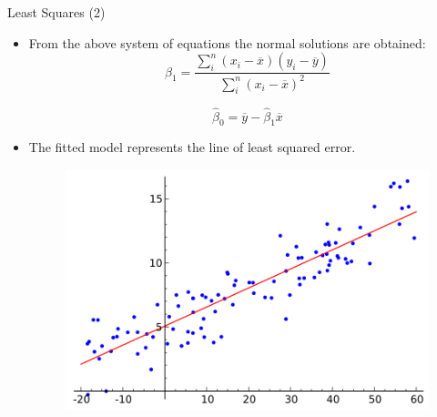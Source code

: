 \documentclass[handout]{beamer}
\begin{document}
\begin{frame}{Least Squares (2)}
\scriptsize{
\begin{itemize}
 \item From the above system of equations the normal solutions are obtained:
  \begin{equation}
 \hat{\beta}_{1} = \frac{\sum_{i}^{n} (x_i-\overline{x})(y_i-\overline{y}) }{ \sum_{i}^{n} (x_i-\overline{x})^2}    
 \end{equation}

 \begin{equation}
 \hat{\beta}_{0} = \overline{y} -\hat{\beta}_{1}\overline{x}    
 \end{equation}



\item The fitted model represents the line of least squared error.

\begin{figure}[h!]
  \centering
  \includegraphics[scale=0.35]{pics/Linear_regression.png}
\end{figure}

\end{itemize}

} 
 
\end{frame}
\end{document}
